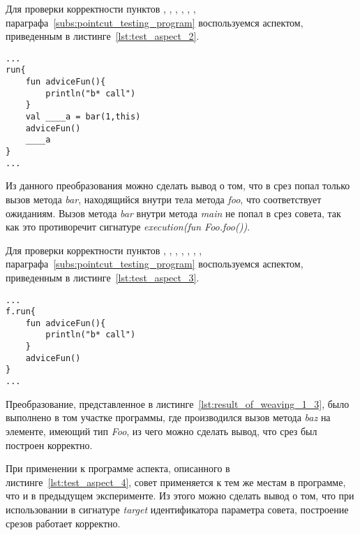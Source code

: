 Для проверки корректности пунктов
 \quotes{\ref{list:method_name_check}},
 \quotes{\ref{list:class_name_check}},
 \quotes{\ref{list:method_modifiers_check}},
 \quotes{\ref{list:method_return_value_check}},
 \quotes{\ref{list:execution_check}},
 \quotes{\ref{list:reference_pointcut_check}},
 \quotes{\ref{list:logic_operations_check}} параграфа~\ref{subs:pointcut_testing_program} воспользуемся аспектом, приведенным в листинге~\ref{lst:test_aspect_2}.
 \begin{lstlisting}[style={java}, label={lst:result_of_weaving_1_2},
 caption={Результат применения аспекта, описанного в листинге~\ref{lst:test_aspect_2}, к тестовой программе}]
...
run{
	fun adviceFun(){
        println("b* call")
    }
	val ____a = bar(1,this)
	adviceFun()
	____a
}
...
\end{lstlisting}
Из данного преобразования можно сделать вывод о том, что в срез попал только вызов метода \textit{bar}, находящийся внутри тела метода \textit{foo}, что соответствует ожиданиям.
Вызов метода \textit{bar} внутри метода \textit{main} не попал в срез совета, так как это противоречит сигнатуре \textit{execution(fun Foo.foo())}.

Для проверки корректности пунктов \quotes{\ref{list:method_name_check}},
\quotes{\ref{list:class_name_check}},
\quotes{\ref{list:method_params_check}},
\quotes{\ref{list:method_modifiers_check}},
\quotes{\ref{list:method_extension_check}},
\quotes{\ref{list:method_return_value_check}},
\quotes{\ref{list:target_check}},
\quotes{\ref{list:logic_operations_check}} параграфа~\ref{subs:pointcut_testing_program} воспользуемся аспектом, приведенным в листинге~\ref{lst:test_aspect_3}.
\begin{lstlisting}[style={java}, label={lst:result_of_weaving_1_3},
 caption={Результат применения аспекта, описанного в листинге~\ref{lst:test_aspect_3}, к тестовой программе}]
...
f.run{
	fun adviceFun(){
        println("b* call")
    }
	adviceFun()
}
...
\end{lstlisting}
Преобразование, представленное в листинге~\ref{lst:result_of_weaving_1_3}, было выполнено в том участке программы, где производился вызов метода \textit{baz} на элементе, имеющий тип \textit{Foo}, из чего можно сделать вывод, что срез был построен корректно.

При применении к программе аспекта, описанного в листинге~\ref{lst:test_aspect_4}, совет применяется к тем же местам в программе, что и в предыдущем эксперименте.
Из этого можно сделать вывод о том, что при использовании в сигнатуре \textit{target} идентификатора параметра совета, построение срезов работает корректно.

